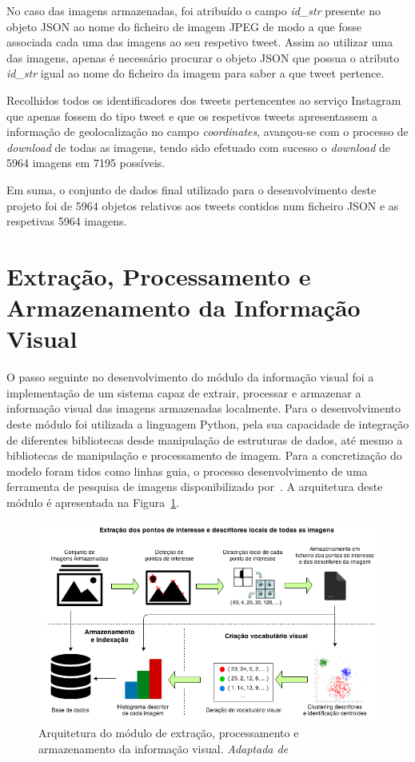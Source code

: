 No caso das imagens armazenadas, foi atribuído o campo \textit{id\_str} presente no objeto JSON ao nome do ficheiro de imagem JPEG de modo a que fosse associada cada uma das imagens ao seu respetivo tweet. Assim ao utilizar uma das imagens, apenas é necessário procurar o objeto JSON que possua o atributo \textit{id\_str} igual ao nome do ficheiro da imagem para saber a que tweet pertence.

Recolhidos todos os identificadores dos tweets pertencentes ao serviço Instagram que apenas fossem do tipo tweet e que os respetivos tweets apresentassem a informação de geolocalização no campo \textit{coordinates}, avançou-se com o processo de \textit{download} de todas as imagens, tendo sido efetuado com sucesso o \textit{download} de 5964 imagens em 7195 possíveis.

Em suma, o conjunto de dados final utilizado para o desenvolvimento deste projeto foi de 5964 objetos relativos aos tweets contidos num ficheiro JSON e as respetivas 5964 imagens.

\section{Extração, Processamento e Armazenamento da Informação Visual} \label{sec:extract}

O passo seguinte no desenvolvimento do módulo da informação visual foi a implementação de um sistema capaz de extrair, processar e armazenar a informação visual das imagens armazenadas localmente. Para o desenvolvimento deste módulo foi utilizada a linguagem Python, pela sua capacidade de integração de diferentes bibliotecas desde manipulação de estruturas de dados, até mesmo a bibliotecas de manipulação e processamento de imagem. Para a concretização do modelo foram tidos como linhas guia, o processo desenvolvimento de uma ferramenta de pesquisa de imagens disponibilizado por~\cite{Solem2012}. A arquitetura deste módulo é apresentada na Figura~\ref{fig:infovisual}.

\begin{figure}[h]
\centering
\includegraphics[width=0.95\linewidth]{./figures/infovisual}
\caption{Arquitetura do módulo de extração, processamento e armazenamento da informação visual. \textit{Adaptada de}~\cite{Bueno2011}}
\label{fig:infovisual}
\end{figure}

